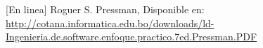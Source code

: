 \begin{thebibliography}{50}
	[En linea] Roguer S. Pressman, Disponible en: \url{http://cotana.informatica.edu.bo/downloads/ld-Ingenieria.de.software.enfoque.practico.7ed.Pressman.PDF}
	
	









%	
%	
%
%	
%	
%	
%	
%	
%	
%	
%	

\end{thebibliography}
